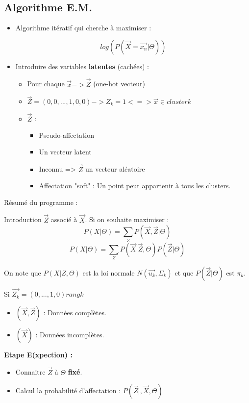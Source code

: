 \documentclass{article}
\begin{document}
\subsection{Algorithme E.M.}

\begin{itemize}

\item Algorithme itératif qui cherche à maximiser : 

\[ log(P(\vec{X} = \vec{x_n} | \Theta))  \]

\item Introduire des variables \textbf{latentes} (cachées) : 

\begin{itemize}

\item Pour chaque $\vec{x} -> \vec{Z}$ (one-hot vecteur)
\item $\vec{Z} = (0, 0, ..., 1, 0, 0) -> Z_k = 1 <=> \vec{x} \in cluster k$
\item $\vec{Z}$ : 
\begin{itemize}
\item Pseudo-affectation
\item Un vecteur latent
\item Inconnu => $\vec{Z}$ un vecteur aléatoire
\item Affectation "soft" : Un point peut appartenir à tous les clusters.
\end{itemize}
\end{itemize}
\end{itemize}

Résumé du programme : 

Introduction $\vec{Z}$ associé à $\vec{X}$. Si on souhaite maximiser : 
\[ P(X | \Theta) = \sum_Z P(\vec{X}, \vec{Z} | \Theta) \]
\[ P(X | \Theta) = \sum_Z P(\vec{X} | \vec{Z}, \Theta) P(\vec{Z} | \Theta) \]

On note que $P(X | Z, \Theta)$ est la loi normale $N(\vec{u_k}, \Sigma_k)$ et que $P(\vec{Z} | \Theta)$ est $\pi_k$.

Si $\vec{Z_k} = (0, ..., 1, 0) rang k$
\begin{itemize}
\item $(\vec{X}, \vec{Z})$ : Données complètes.
\item $(\vec{X})$ : Données incomplètes.
\end{itemize}

\textbf{Etape E(xpection) : }
\begin{itemize}
\item Connaitre $\vec{Z}$ à $\Theta$ \textbf{fixé}.
\item Calcul la probabilité d'affectation : $P(\vec{Z} |, \vec{X}, \Theta)$
\end{itemize}
\end{document}
